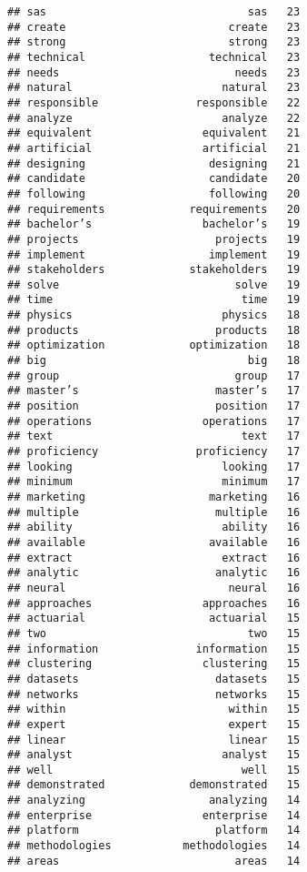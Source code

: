\documentclass[]{article}
\begin{document}
\begin{verbatim}
## sas                               sas   23
## create                         create   23
## strong                         strong   23
## technical                   technical   23
## needs                           needs   23
## natural                       natural   23
## responsible               responsible   22
## analyze                       analyze   22
## equivalent                 equivalent   21
## artificial                 artificial   21
## designing                   designing   21
## candidate                   candidate   20
## following                   following   20
## requirements             requirements   20
## bachelor’s                 bachelor’s   19
## projects                     projects   19
## implement                   implement   19
## stakeholders             stakeholders   19
## solve                           solve   19
## time                             time   19
## physics                       physics   18
## products                     products   18
## optimization             optimization   18
## big                               big   18
## group                           group   17
## master’s                     master’s   17
## position                     position   17
## operations                 operations   17
## text                             text   17
## proficiency               proficiency   17
## looking                       looking   17
## minimum                       minimum   17
## marketing                   marketing   16
## multiple                     multiple   16
## ability                       ability   16
## available                   available   16
## extract                       extract   16
## analytic                     analytic   16
## neural                         neural   16
## approaches                 approaches   16
## actuarial                   actuarial   15
## two                               two   15
## information               information   15
## clustering                 clustering   15
## datasets                     datasets   15
## networks                     networks   15
## within                         within   15
## expert                         expert   15
## linear                         linear   15
## analyst                       analyst   15
## well                             well   15
## demonstrated             demonstrated   15
## analyzing                   analyzing   14
## enterprise                 enterprise   14
## platform                     platform   14
## methodologies           methodologies   14
## areas                           areas   14

\end{verbatim}
\end{document}
